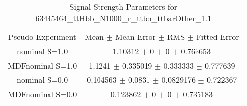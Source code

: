 \begin{table}
\centering
\caption{Signal Strength Parameters for 63445464\_ttHbb\_N1000\_r\_ttbb\_ttbarOther\_1.1}
\begin{tabular}{cc}
\toprule
Pseudo Experiment & Mean $\pm$ Mean Error $\pm$ RMS $\pm$ Fitted Error\\
nominal S=1.0 & \num{1.10312} $\pm$ \num{0} $\pm$ \num{0} $\pm$ \num{0.763653}\\
MDFnominal S=1.0 & \num{1.1241} $\pm$ \num{0.335019} $\pm$ \num{0.333333} $\pm$ \num{0.777639}\\
nominal S=0.0 & \num{0.104563} $\pm$ \num{0.0831} $\pm$ \num{0.0829176} $\pm$ \num{0.722367}\\
MDFnominal S=0.0 & \num{0.123862} $\pm$ \num{0} $\pm$ \num{0} $\pm$ \num{0.735183}\\
\bottomrule
\end{tabular}
\end{table}